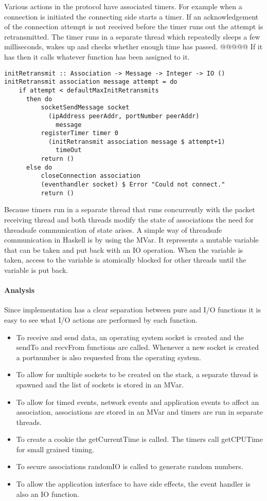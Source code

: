 Various actions in the protocol have associated timers. For example when a connection is initiated the connecting side starts a timer. If an acknowledgement of the connection attempt is not received before the timer runs out the attempt is retransmitted.
The timer runs in a separate thread which repeatedly sleeps a few milliseconds, wakes up and checks whether enough time has passed. @@@@@ If it has then it calls whatever function has been assigned to it. 

\begin{lstlisting}[caption={The init retransmission function}]
initRetransmit :: Association -> Message -> Integer -> IO ()
initRetransmit association message attempt = do
    if attempt < defaultMaxInitRetransmits
      then do
          socketSendMessage socket 
            (ipAddress peerAddr, portNumber peerAddr)
              message
          registerTimer timer 0
            (initRetransmit association message $ attempt+1)
              timeOut
          return ()
      else do
          closeConnection association
          (eventhandler socket) $ Error "Could not connect."
          return ()
\end{lstlisting}

Because timers run in a separate thread that runs concurrently with the packet receiving thread and both threads modify the state of associations the need for threadsafe communication of state arises. A simple way of threadsafe communication in Haskell is by using the MVar. It represents a mutable variable that can be taken and put back with an IO operation. When the variable is taken, access to the variable is atomically blocked for other threads until the variable is put back. 

\paragraph{Analysis}
Since implementation has a clear separation between pure and I/O functions it is easy to see what I/O actions are performed by each function. 

\begin{itemize}
\item To receive and send data, an operating system socket is created and the sendTo and recvFrom functions are called. Whenever a new socket is created a portnumber is also requested from the operating system.
\item To allow for multiple sockets to be created on the stack, a separate thread is spawned and the list of sockets is stored in an MVar.
\item To allow for timed events, network events and application events to affect an association, associations are stored in an MVar and timers are run in separate threads.
\item To create a cookie the getCurrentTime is called. The timers call getCPUTime for small grained timing.
\item To secure associations randomIO is called to generate random numbers.
\item To allow the application interface to have side effects, the event handler is also an IO function.
\end{itemize}

